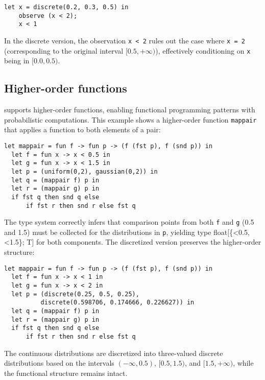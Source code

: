 \documentclass[acmsmall,screen,dvipsnames,x11names,nonacm,anonymous,review]{acmart}
\newcommand{\codetype}[1]{\textcolor{typecolor}{\ttfamily\small#1}}
\newcommand{\ft}[1]{\codetype{float[\{#1\}; T]}}        %
\begin{document}
\begin{lstlisting}[aboveskip=1em,belowskip=1em]
    let x = discrete(0.2, 0.3, 0.5) in
    observe (x < 2);
    x < 1
\end{lstlisting}

\noindent In the discrete version, the observation \texttt{x < 2} rules out the case where \texttt{x = 2} (corresponding to the original interval $[0.5, +\infty)$), effectively conditioning on \texttt{x} being in $[0.0, 0.5)$.

\subsection{Higher-order functions}

\Slice{} supports higher-order functions, enabling functional programming patterns with probabilistic computations. This example shows a higher-order function \texttt{mappair} that applies a function to both elements of a pair:

\begin{lstlisting}[aboveskip=1em,belowskip=1em,escapechar=!]
  let mappair = fun f -> fun p -> (f (fst p), f (snd p)) in
  let f = fun x -> x < 0.5 in
  let g = fun x -> x < 1.5 in
  let p = (uniform(0,2), gaussian(0,2)) in
  let q = (mappair f) p in
  let r = (mappair g) p in
  if fst q then snd q else 
      if fst r then snd r else fst q
\end{lstlisting}

\noindent The type system correctly infers that comparison points from both \texttt{f} and \texttt{g} (0.5 and 1.5) must be collected for the distributions in \texttt{p}, yielding type \ft{<0.5,<1.5} for both components. The discretized version preserves the higher-order structure:

\begin{lstlisting}[aboveskip=1em,belowskip=1em]
  let mappair = fun f -> fun p -> (f (fst p), f (snd p)) in
  let f = fun x -> x < 1 in
  let g = fun x -> x < 2 in
  let p = (discrete(0.25, 0.5, 0.25), 
          discrete(0.598706, 0.174666, 0.226627)) in
  let q = (mappair f) p in
  let r = (mappair g) p in
  if fst q then snd q else 
      if fst r then snd r else fst q
\end{lstlisting}

\noindent The continuous distributions are discretized into three-valued discrete distributions based on the intervals $(-\infty, 0.5)$, $[0.5, 1.5)$, and $[1.5, +\infty)$, while the functional structure remains intact.
\end{document}
